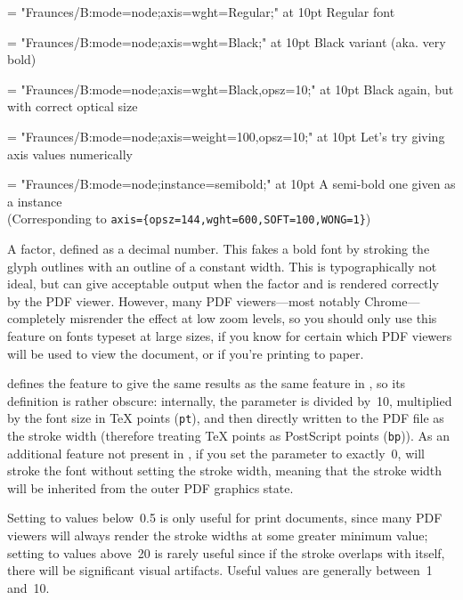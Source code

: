       {\def\fraunces#1#2{%
         \font\varfont = "Fraunces/B:mode=node;#1;" at #2pt\varfont
       }
       \fraunces{axis={wght=Regular}}{10}Regular font\par
       \fraunces{axis={wght=Black}}{10}Black variant (aka. very bold)\par
       \fraunces{axis={wght=Black,opsz=10}}{10}Black again, but with
       correct optical size\par
       \fraunces{axis={weight=100,opsz=10}}{10}Let's try giving axis values
       numerically\par
       \fraunces{instance=semibold}{10}A semi-bold one given as a
       instance\\
       (Corresponding to
       \verb|axis={opsz=144,wght=600,SOFT=100,WONG=1}|)\par
      }

  \endaltitem

         A factor, defined as a decimal number. This fakes a bold font by
         stroking the glyph outlines with an outline of a constant width. This
         is typographically not ideal, but can give acceptable output when the
         factor and is rendered correctly by the PDF viewer. However, many PDF
         viewers---most notably Chrome---completely misrender the effect at low
         zoom levels, so you should only use this feature on fonts typeset at
         large sizes, if you know for certain which PDF viewers will be used to
         view the document, or if you're printing to paper.

          defines the  feature to
         give the same results as the same feature in \XeTeX, so its definition
         is rather obscure: internally, the  parameter is
         divided by~10, multiplied by the font size in \TeX{} points
         (\verb|pt|), and then directly written to the PDF file as the stroke
         width (therefore treating \TeX{} points as PostScript points
         (\verb|bp|)). As an additional feature not present in \XeTeX, if you
         set the  parameter to exactly~0, \LuaTeX{} will
         stroke the font without setting the stroke width, meaning that the
         stroke width will be inherited from the outer PDF graphics state.

         Setting  to values below~0.5 is only useful for
         print documents, since many PDF viewers will always render the stroke
         widths at some greater minimum value; setting  to
         values above~20 is rarely useful since if the stroke overlaps with
         itself, there will be significant visual artifacts. Useful values are
         generally between~1 and~10.

